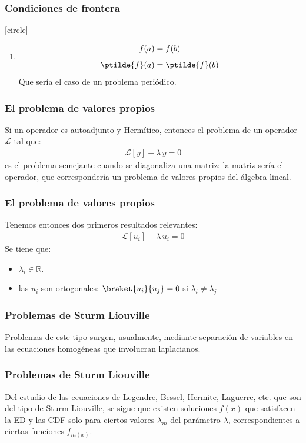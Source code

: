 \begin{frame}
\frametitle{Condiciones de frontera}
[circle]
\begin{enumerate}[<+->]
\conti
\item 
\begin{align*}
f(a) &= f(b) \\[0.5em]
\ptilde{f}(a) &= \ptilde{f}(b)
\end{align*}
Que sería el caso de un problema periódico.
\end{enumerate}
\end{frame}
\begin{frame}
\frametitle{El problema de valores propios}
Si un operador es autoadjunto y Hermítico, entonces el problema de un operador $\mathcal{L}$ tal que:
\begin{align*}
\mathcal{L} [y] + \lambda \, y = 0
\end{align*}
es el problema semejante cuando se diagonaliza una matriz: la matriz sería el operador, que correspondería un problema de valores propios del álgebra lineal.
\end{frame}
\begin{frame}
\frametitle{El problema de valores propios}
Tenemos entonces dos primeros resultados relevantes:
\begin{align*}
\mathcal{L} [u_{i}] + \lambda \, u_{i} = 0
\end{align*}
Se tiene que:
\begin{itemize}[<+->]
\item $\lambda_{i} \in \mathbb{R}$.
\item las $u_{i}$ son ortogonales: $\braket{u_{i}}{u_{j}} = 0$ si $\lambda_{i} \neq \lambda_{j}$
\end{itemize}
\end{frame}
\begin{frame}
\frametitle{Problemas de Sturm Liouville}
Problemas de este tipo surgen, usualmente, mediante separación de variables en las ecuaciones homogéneas que involucran laplacianos.
\end{frame}
\begin{frame}
\frametitle{Problemas de Sturm Liouville}
Del estudio de las ecuaciones de Legendre, Bessel, Hermite, Laguerre, etc. que son del tipo de Sturm Liouville, se sigue que existen soluciones $f(x)$ que satisfacen la ED y las CDF solo para ciertos valores $\lambda_{m}$ del parámetro $\lambda$, correspondientes a ciertas funciones $f_{m(x)}$.
\end{frame}

